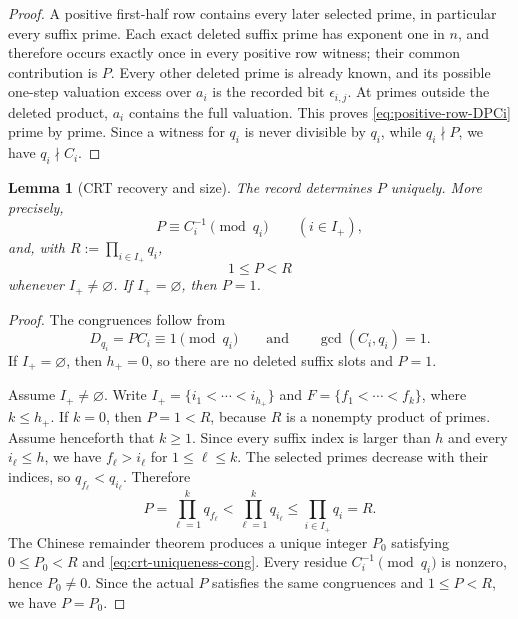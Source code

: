 \documentclass[11pt]{amsart}
\newtheorem{lemma}[lemma]{Lemma}
\theoremstyle{definition}
\theoremstyle{remark}
\numberwithin{equation}{section}
\begin{document}
\begin{proof}
A positive first-half row contains every later selected prime, in
particular every suffix prime.  Each exact deleted suffix prime has
exponent one in $n$, and therefore occurs exactly once in every positive
row witness; their common contribution is $P$.  Every other deleted
prime is already known, and its possible one-step valuation excess over
$a_i$ is the recorded bit $\epsilon_{i,j}$.  At primes outside the
deleted product, $a_i$ contains the full valuation.  This proves
\eqref{eq:positive-row-DPCi} prime by prime.  Since a witness for $q_i$
is never divisible by $q_i$, while $q_i\nmid P$, we have
$q_i\nmid C_i$.
\end{proof}

\begin{lemma}[CRT recovery and size]\label{lem:crt-recovery}
The record determines $P$ uniquely.  More precisely,
\begin{equation}\label{eq:crt-uniqueness-cong}
 P\equiv C_i^{-1}\pmod{q_i}\qquad(i\in I_+),
\end{equation}
and, with $R:=\prod_{i\in I_+}q_i$,
\begin{equation}\label{eq:P-size}
 1\le P<R
\end{equation}
whenever $I_+\ne\varnothing$.  If $I_+=\varnothing$, then $P=1$.
\end{lemma}

\begin{proof}
The congruences follow from
\[
 D_{q_i}=PC_i\equiv1\pmod{q_i}
 \qquad\text{and}\qquad
 \gcd(C_i,q_i)=1.
\]  If $I_+=\varnothing$, then $h_+=0$, so there are no
deleted suffix slots and $P=1$.

Assume $I_+\ne\varnothing$.  Write
$I_+=\{i_1<\cdots<i_{h_+}\}$ and
$F=\{f_1<\cdots<f_k\}$, where $k\le h_+$.  If $k=0$, then $P=1<R$,
because $R$ is a nonempty product of primes.  Assume henceforth that
$k\ge1$.  Since every suffix index is larger than $h$ and every
$i_\ell\le h$, we have $f_\ell>i_\ell$ for $1\le\ell\le k$.  The
selected primes decrease with their indices, so
$q_{f_\ell}<q_{i_\ell}$.  Therefore
\[
 P=\prod_{\ell=1}^k q_{f_{\ell}}
 <\prod_{\ell=1}^k q_{i_{\ell}}
 \le\prod_{i\in I_+}q_i=R.
\]
The Chinese remainder theorem produces a unique integer $P_0$ satisfying
$0\le P_0<R$ and \eqref{eq:crt-uniqueness-cong}.  Every residue
$C_i^{-1}\pmod{q_i}$ is nonzero, hence $P_0\ne0$.  Since the actual $P$
satisfies the same congruences and $1\le P<R$, we have $P=P_0$.
\end{proof}
\end{document}
